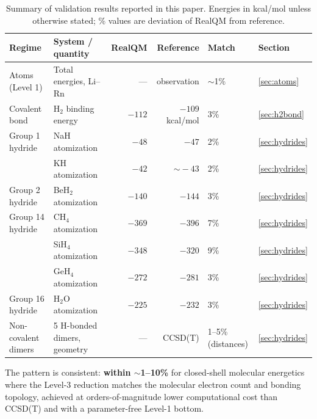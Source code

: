 \documentclass[11pt]{article}
\begin{document}
\begin{table}[h!]
\centering
\small
\renewcommand{\arraystretch}{1.15}
\begin{tabular}{l l r r l l}
\toprule
\textbf{Regime} & \textbf{System / quantity} & \textbf{RealQM} & \textbf{Reference} & \textbf{Match} & \textbf{Section} \\
\midrule
Atoms (Level 1)        & Total energies, Li--Rn        & ---         & observation     & $\sim$1\%               & \ref{sec:atoms}     \\
\midrule
Covalent bond          & H$_2$ binding energy          & $-112$      & $-109$ kcal/mol & 3\%                     & \ref{sec:h2bond}    \\
\midrule
Group 1 hydride        & NaH atomization                & $-48$       & $-47$           & 2\%                     & \ref{sec:hydrides}  \\
                       & KH atomization                 & $-42$       & $\sim\!-43$     & 2\%                     & \ref{sec:hydrides}  \\
Group 2 hydride        & BeH$_2$ atomization            & $-140$      & $-144$          & 3\%                     & \ref{sec:hydrides}  \\
Group 14 hydride       & CH$_4$ atomization             & $-369$      & $-396$          & 7\%                     & \ref{sec:hydrides}  \\
                       & SiH$_4$ atomization            & $-348$      & $-320$          & 9\%                     & \ref{sec:hydrides}  \\
                       & GeH$_4$ atomization            & $-272$      & $-281$          & 3\%                     & \ref{sec:hydrides}  \\
Group 16 hydride       & H$_2$O atomization             & $-225$      & $-232$          & 3\%                     & \ref{sec:hydrides}  \\
\midrule
Non-covalent dimers    & 5 H-bonded dimers, geometry    & ---         & CCSD(T)         & 1--5\% (distances)      & \ref{sec:hydrides}  \\
\bottomrule
\end{tabular}
\caption{Summary of validation results reported in this paper. Energies in kcal/mol unless otherwise stated; \% values are deviation of RealQM from reference.}
\label{tab:summary}
\end{table}

The pattern is consistent: \textbf{within $\sim$1--10\%} for closed-shell molecular energetics where the Level-3 reduction matches the molecular electron count and bonding topology, achieved at orders-of-magnitude lower computational cost than CCSD(T) and with a parameter-free Level-1 bottom.
\end{document}
